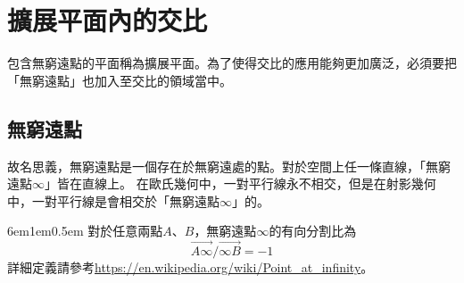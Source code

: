 \documentclass[12pt]{article}
\begin{document}
\section{擴展平面內的交比}
包含無窮遠點的平面稱為擴展平面。為了使得交比的應用能夠更加廣泛，必須要把「無窮遠點」也加入至交比的領域當中。
\subsection{無窮遠點}
故名思義，無窮遠點是一個存在於無窮遠處的點。對於空間上任一條直線，「無窮遠點$\infty$」皆在直線上。
在歐氏幾何中，一對平行線永不相交，但是在射影幾何中，一對平行線是會相交於「無窮遠點$\infty$」的。
\begin{mybox}[數值定義]{6em}{1em}{0.5em}
    對於任意兩點$A$、$B$，無窮遠點$\infty$的有向分割比為
    $$
        \overrightarrow{A\infty}/\overrightarrow{\infty B}=-1
    $$
    詳細定義請參考\url{https://en.wikipedia.org/wiki/Point_at_infinity}。
\end{mybox}
\end{document}
